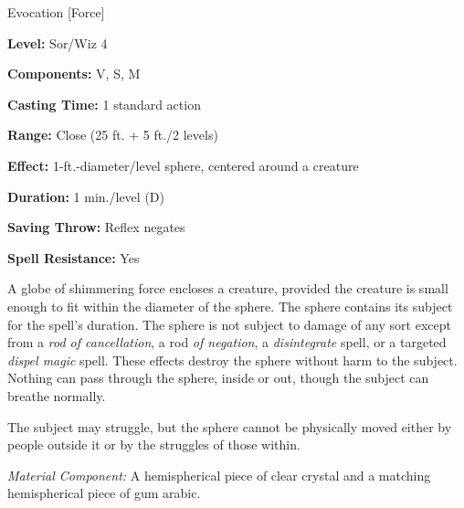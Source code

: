 
Evocation [Force]

\textbf{Level:} Sor/Wiz 4

\textbf{Components:} V, S, M

\textbf{Casting Time:} 1 standard action

\textbf{Range:} Close (25 ft. + 5 ft./2 levels)

\textbf{Effect:} 1-ft.-diameter/level sphere, centered around a creature

\textbf{Duration:} 1 min./level (D)

\textbf{Saving Throw:} Reflex negates

\textbf{Spell Resistance:} Yes

A globe of shimmering force encloses a creature, provided the creature is small 
enough to fit within the diameter of the sphere. The sphere contains its subject 
for the spell's duration. The sphere is not subject to damage of any sort except 
from a \textit{rod of cancellation}, a rod \textit{of negation}, a \textit{disintegrate 
}spell, or a targeted \textit{dispel magic} spell. These effects destroy the sphere 
without harm to the subject. Nothing can pass through the sphere, inside or out, 
though the subject can breathe normally.

The subject may struggle, but the sphere cannot be physically moved either by people 
outside it or by the struggles of those within.

\textit{Material Component:} A hemispherical piece of clear crystal and a matching 
hemispherical piece of gum arabic.

